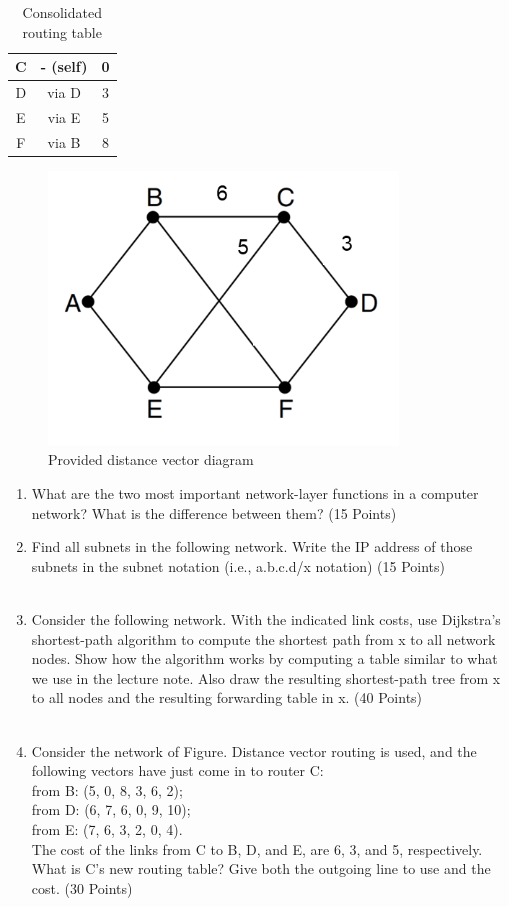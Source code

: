 \documentclass[11pt]{article}
\begin{document}
{{\begin{table}[h!]
\begin{tabular}{|c|c|c|}
            \hline
            C & - (self) & 0 \\
            \hline
            D & via D & 3 \\
            \hline
            E & via E & 5 \\
            \hline
            F & via B & 8 \\
            \hline
        \end{tabular}
        \caption{Consolidated routing table}
    \end{table}
    \begin{figure}[ht]
        \centering
        \includegraphics[width=0.5\linewidth]{distance-vector-diagram.png}
        \caption{Provided distance vector diagram}
    \end{figure}
}}


\begin{enumerate}
    \item What are the two most important network-layer functions in a computer network? What
    is the difference between them? (15 Points) \\ \answerOne
    \item Find all subnets in the following network. Write the IP address of those subnets in the
    subnet notation (i.e., a.b.c.d/x notation) (15 Points) \\\\ \answerTwo
    \item Consider the following network. With the indicated link costs, use Dijkstra’s shortest-path
    algorithm to compute the shortest path from x to all network nodes. Show how the
    algorithm works by computing a table similar to what we use in the lecture note. Also
    draw the resulting shortest-path tree from x to all nodes and the resulting forwarding
    table in x. (40 Points) \\\\ \answerThree    
    \item Consider the network of Figure. Distance vector routing is used, and the following vectors
    have just come in to router C: \\
    from B: (5, 0, 8, 3, 6, 2); \\
    from D: (6, 7, 6, 0, 9, 10); \\
    from E: (7, 6, 3, 2, 0, 4). \\
    The cost of the links from C to B, D, and E, are 6, 3, and 5, respectively. What is C’s new
    routing table? Give both the outgoing line to use and the cost. (30 Points) \\\\ \answerFour   
\end{enumerate}
\end{document}
